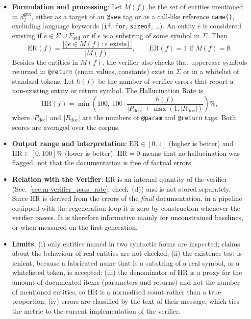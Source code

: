 \begin{itemize}[leftmargin=*, label=\textbullet]
	\item \textbf{Formulation and processing}: Let $M(f)$ be the set of entities mentioned in
	$d_f^{\mathrm{gen}}$, either as a target of an \texttt{@see} tag or as a call-like reference
	\texttt{name()}, excluding language keywords (\texttt{if}, \texttt{for}, \texttt{sizeof}, \ldots).
	An entity $e$ is considered existing if $e\in\Sigma\cup\Sigma_{\mathrm{std}}$ or if $e$ is a
	substring of some symbol in $\Sigma$. Then
	\begin{equation}
		\mathrm{ER}(f) = \frac{|\{e\in M(f) : e \text{ exists}\}|}{|M(f)|},
		\qquad \mathrm{ER}(f)=1 \text{ if } M(f)=\emptyset .
		\label{eq:existence_ratio}
	\end{equation}
	Besides the entities in $M(f)$, the verifier also checks that uppercase symbols returned in
	\texttt{@return} (enum values, constants) exist in $\Sigma$ or in a whitelist of standard tokens.
	Let $h(f)$ be the number of verifier errors that report a non-existing entity or return symbol. The
	Hallucination Rate is
	\begin{equation}
		\mathrm{HR}(f) = \min\!\left(100,\ 100\cdot
		\frac{h(f)}{|P_{\mathrm{doc}}| + \max(1,|R_{\mathrm{doc}}|)}\right)\%,
		\label{eq:hallucination_rate}
	\end{equation}
	where $|P_{\mathrm{doc}}|$ and $|R_{\mathrm{doc}}|$ are the numbers of \texttt{@param} and
	\texttt{@return} tags. Both scores are averaged over the corpus.

	\item \textbf{Output range and interpretation}: $\mathrm{ER}\in[0,1]$ (higher is better) and
	$\mathrm{HR}\in[0,100]\%$ (lower is better). $\mathrm{HR}=0$ means that no hallucination was
	flagged, not that the documentation is free of factual errors.

	\item \textbf{Relation with the Verifier}: $\mathrm{ER}$ is an internal quantity of the verifier
	(Sec.~\ref{sec:m-verifier_pass_rate}, check~(d)) and is not stored separately. Since $\mathrm{HR}$ is
	derived from the errors of the \emph{final} documentation, in a pipeline equipped with the
	regeneration loop it is zero by construction whenever the verifier passes. It is therefore
	informative mainly for unconstrained baselines, or when measured on the first generation.

	\item \textbf{Limits}: (i) only entities named in two syntactic forms are inspected; claims
	about the behaviour of real entities are not checked; (ii) the existence test is lenient,
	because a fabricated name that is a substring of a real symbol, or a whitelisted token, is
	accepted; (iii) the denominator of $\mathrm{HR}$ is a proxy for the amount of documented items
	(parameters and returns) and not the number of mentioned entities, so $\mathrm{HR}$ is a
	normalised count rather than a true proportion; (iv) errors are classified by the text of
	their message, which ties the metric to the current implementation of the verifier.
\end{itemize}

